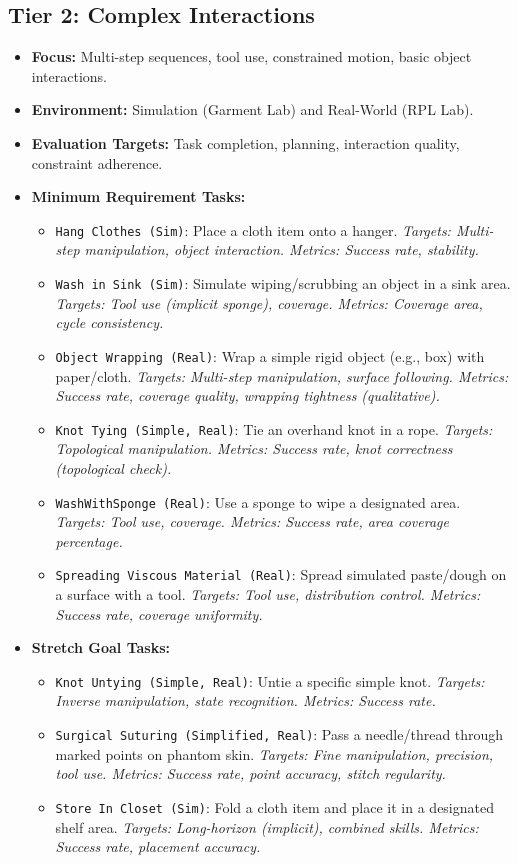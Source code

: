 \subsection{Tier 2: Complex Interactions}
\begin{itemize}
    \item \textbf{Focus:} Multi-step sequences, tool use, constrained motion, basic object interactions.
    \item \textbf{Environment:} Simulation (Garment Lab) and Real-World (RPL Lab).
    \item \textbf{Evaluation Targets:} Task completion, planning, interaction quality, constraint adherence.
    \item \textbf{Minimum Requirement Tasks:}
        \begin{itemize}
            \item \texttt{Hang Clothes (Sim)}: Place a cloth item onto a hanger. \textit{Targets: Multi-step manipulation, object interaction. Metrics: Success rate, stability.}
            \item \texttt{Wash in Sink (Sim)}: Simulate wiping/scrubbing an object in a sink area. \textit{Targets: Tool use (implicit sponge), coverage. Metrics: Coverage area, cycle consistency.}
            \item \texttt{Object Wrapping (Real)}: Wrap a simple rigid object (e.g., box) with paper/cloth. \textit{Targets: Multi-step manipulation, surface following. Metrics: Success rate, coverage quality, wrapping tightness (qualitative).}
            \item \texttt{Knot Tying (Simple, Real)}: Tie an overhand knot in a rope. \textit{Targets: Topological manipulation. Metrics: Success rate, knot correctness (topological check).}
            \item \texttt{WashWithSponge (Real)}: Use a sponge to wipe a designated area. \textit{Targets: Tool use, coverage. Metrics: Success rate, area coverage percentage.}
            \item \texttt{Spreading Viscous Material (Real)}: Spread simulated paste/dough on a surface with a tool. \textit{Targets: Tool use, distribution control. Metrics: Success rate, coverage uniformity.}
        \end{itemize}
    \item \textbf{Stretch Goal Tasks:}
        \begin{itemize}
            \item \texttt{Knot Untying (Simple, Real)}: Untie a specific simple knot. \textit{Targets: Inverse manipulation, state recognition. Metrics: Success rate.}
            \item \texttt{Surgical Suturing (Simplified, Real)}: Pass a needle/thread through marked points on phantom skin. \textit{Targets: Fine manipulation, precision, tool use. Metrics: Success rate, point accuracy, stitch regularity.}
            \item \texttt{Store In Closet (Sim)}: Fold a cloth item and place it in a designated shelf area. \textit{Targets: Long-horizon (implicit), combined skills. Metrics: Success rate, placement accuracy.}
        \end{itemize}
\end{itemize}

